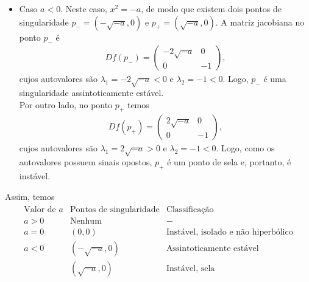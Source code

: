 \begin{homeworkProblem}[2]
\begin{solution}
\begin{itemize}
        Além disso, $(0,0)$ é uma singularidade isolada, pois é o único ponto de equilíbrio para $a=0$.
      \item Caso $a<0$.
        Neste caso, $x^2=-a$, de modo que existem dois pontos de singularidade $p_-=(-\sqrt{-a},0)$ e $p_+=(\sqrt{-a},0)$. A matriz jacobiana no ponto $p_-$ é
        \begin{align*}
          Df(p_-)=\begin{pmatrix}
            -2\sqrt{-a} & 0\\
            0 & -1
          \end{pmatrix},
        \end{align*}
        cujos autovalores são $\lambda_1=-2\sqrt{-a}<0$ e $\lambda_2=-1<0$. Logo, $p_-$ é uma singularidade assintoticamente estável.\\
        Por outro lado, no ponto $p_+$ temos
        \begin{align*}
          Df(p_+)=\begin{pmatrix}
            2\sqrt{-a} & 0\\
            0 & -1
          \end{pmatrix},
        \end{align*}
        cujos autovalores são $\lambda_1=2\sqrt{-a}>0$ e $\lambda_2=-1<0$. Logo, como os autovalores possuem sinais opostos, $p_+$ é um ponto de sela e, portanto, é instável.
    \end{itemize}
    Assim, temos
    \begin{align*}
      \begin{array}{c|c|c}
        \text{Valor de }a & \text{Pontos de singularidade} & \text{Classificação}\\
        \hline
        a>0 & \text{Nenhum} & -\\[2mm]
        a=0 & (0,0) & \text{Instável, isolado e não hiperbólico}\\[2mm]
        a<0 & (-\sqrt{-a},0) & \text{Assintoticamente estável}\\
        & (\sqrt{-a},0) & \text{Instável, sela}
      \end{array}
    \end{align*}
  \end{solution}
\end{homeworkProblem}
